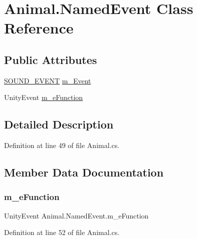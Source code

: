 \hypertarget{class_animal_1_1_named_event}{}\section{Animal.\+Named\+Event Class Reference}
\label{class_animal_1_1_named_event}
\subsection*{Public Attributes}
\begin{DoxyCompactItemize}
\item 
\mbox{\hyperlink{class_animal_aa498775210af23df33eb0095e81ecbf7}{S\+O\+U\+N\+D\+\_\+\+E\+V\+E\+NT}} \mbox{\hyperlink{class_animal_1_1_named_event_adcb60c80d054168ac063806bacaccd68}{m\+\_\+\+Event}}
\item 
Unity\+Event \mbox{\hyperlink{class_animal_1_1_named_event_acca54a65078b3aa0c90d6cd6e6f1da6e}{m\+\_\+e\+Function}}
\end{DoxyCompactItemize}


\subsection{Detailed Description}


Definition at line 49 of file Animal.\+cs.



\subsection{Member Data Documentation}
\mbox{\label{class_animal_1_1_named_event_acca54a65078b3aa0c90d6cd6e6f1da6e}} 
\subsubsection{\texorpdfstring{m\+\_\+e\+Function}{m\_eFunction}}
{\footnotesize\ttfamily Unity\+Event Animal.\+Named\+Event.\+m\+\_\+e\+Function}



Definition at line 52 of file Animal.\+cs.

\mbox{\label{class_animal_1_1_named_event_adcb60c80d054168ac063806bacaccd68}} 
